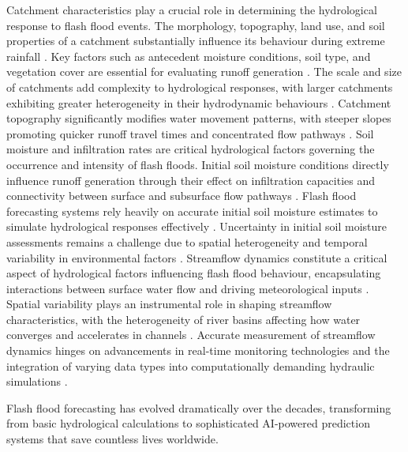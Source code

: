 Catchment characteristics play a crucial role in determining the hydrological response to flash flood events. The morphology, topography, land use, and soil properties of a catchment substantially influence its behaviour during extreme rainfall \citep{Henao2022, Liu2011}. Key factors such as antecedent moisture conditions, soil type, and vegetation cover are essential for evaluating runoff generation \citep{Henao2022a, Liu2011}. The scale and size of catchments add complexity to hydrological responses, with larger catchments exhibiting greater heterogeneity in their hydrodynamic behaviours \citep{Luong2021}. Catchment topography significantly modifies water movement patterns, with steeper slopes promoting quicker runoff travel times and concentrated flow pathways \citep{Liu2011, Maqtan2022a}. Soil moisture and infiltration rates are critical hydrological factors governing the occurrence and intensity of flash floods. Initial soil moisture conditions directly influence runoff generation through their effect on infiltration capacities and connectivity between surface and subsurface flow pathways \citep{Yatheendradas2008}. Flash flood forecasting systems rely heavily on accurate initial soil moisture estimates to simulate hydrological responses effectively \citep{Yatheendradas2008, AlRawas2024, Xing2019a}. Uncertainty in initial soil moisture assessments remains a challenge due to spatial heterogeneity and temporal variability in environmental factors \citep{Yatheendradas2008, AlRawas2024}. Streamflow dynamics constitute a critical aspect of hydrological factors influencing flash flood behaviour, encapsulating interactions between surface water flow and driving meteorological inputs \citep{Yang2022}. Spatial variability plays an instrumental role in shaping streamflow characteristics, with the heterogeneity of river basins affecting how water converges and accelerates in channels \citep{Zhang2024}. Accurate measurement of streamflow dynamics hinges on advancements in real-time monitoring technologies and the integration of varying data types into computationally demanding hydraulic simulations \citep{Msigwa2024, Barthold2015}.

Flash flood forecasting has evolved dramatically over the decades, transforming from basic hydrological calculations to sophisticated AI-powered prediction systems that save countless lives worldwide.

